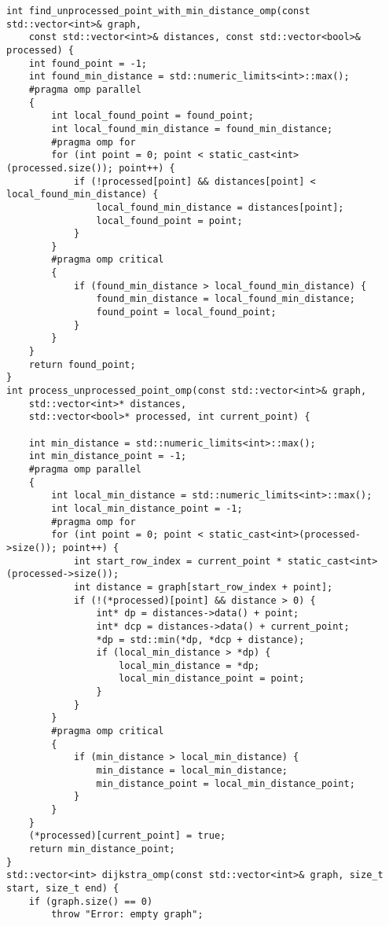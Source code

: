 \documentclass{report}
\begin{document}
\begin{lstlisting}
int find_unprocessed_point_with_min_distance_omp(const std::vector<int>& graph,
    const std::vector<int>& distances, const std::vector<bool>& processed) {
    int found_point = -1;
    int found_min_distance = std::numeric_limits<int>::max();
    #pragma omp parallel
    {
        int local_found_point = found_point;
        int local_found_min_distance = found_min_distance;
        #pragma omp for
        for (int point = 0; point < static_cast<int>(processed.size()); point++) {
            if (!processed[point] && distances[point] < local_found_min_distance) {
                local_found_min_distance = distances[point];
                local_found_point = point;
            }
        }
        #pragma omp critical
        {
            if (found_min_distance > local_found_min_distance) {
                found_min_distance = local_found_min_distance;
                found_point = local_found_point;
            }
        }
    }
    return found_point;
}
int process_unprocessed_point_omp(const std::vector<int>& graph,
    std::vector<int>* distances,
    std::vector<bool>* processed, int current_point) {

    int min_distance = std::numeric_limits<int>::max();
    int min_distance_point = -1;
    #pragma omp parallel
    {
        int local_min_distance = std::numeric_limits<int>::max();
        int local_min_distance_point = -1;
        #pragma omp for
        for (int point = 0; point < static_cast<int>(processed->size()); point++) {
            int start_row_index = current_point * static_cast<int>(processed->size());
            int distance = graph[start_row_index + point];
            if (!(*processed)[point] && distance > 0) {
                int* dp = distances->data() + point;
                int* dcp = distances->data() + current_point;
                *dp = std::min(*dp, *dcp + distance);
                if (local_min_distance > *dp) {
                    local_min_distance = *dp;
                    local_min_distance_point = point;
                }
            }
        }
        #pragma omp critical
        {
            if (min_distance > local_min_distance) {
                min_distance = local_min_distance;
                min_distance_point = local_min_distance_point;
            }
        }
    }
    (*processed)[current_point] = true;
    return min_distance_point;
}
std::vector<int> dijkstra_omp(const std::vector<int>& graph, size_t start, size_t end) {
    if (graph.size() == 0)
        throw "Error: empty graph";


\end{lstlisting}
\end{document}
